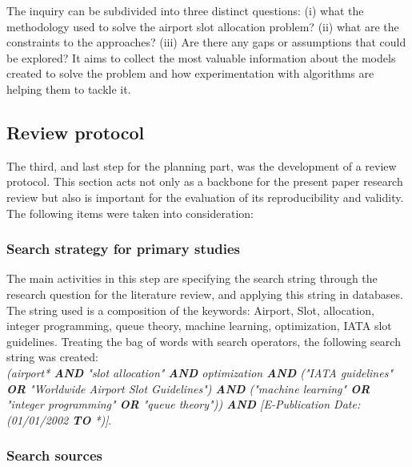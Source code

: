 The inquiry can be subdivided into three distinct questions: (i) what the methodology used to solve the airport slot allocation problem? (ii) what are the constraints to the approaches? (iii) Are there any gaps or assumptions that could be explored? It aims to collect the most valuable information about the models created to solve the problem and how experimentation with algorithms are helping them to tackle it.

\subsection{Review protocol}

The third, and last step for the planning part, was the development of a review protocol. This section acts not only as a backbone for the present paper research review but also is important for the evaluation of its reproducibility and validity. The following items were taken into consideration:

\subsubsection{Search strategy for primary studies}

The main activities in this step are specifying the search string through the research question for the literature review, and applying this string in databases. The string used is a composition of the keywords: Airport, Slot, allocation, integer programming, queue theory, machine learning, optimization, IATA slot guidelines. Treating the bag of words with search operators, the following search string was created: 
\\

\textit{(airport* \textbf{AND} "slot allocation" \textbf{AND}
 optimization \textbf{AND} ("IATA guidelines" \textbf{OR} "Worldwide Airport Slot Guidelines") \textbf{AND} ("machine learning" \textbf{OR} "integer programming" \textbf{OR} "queue theory")) \textbf{AND} [E-Publication Date: (01/01/2002 \textbf{TO} *)]}. 
\\

\subsubsection{Search sources}

